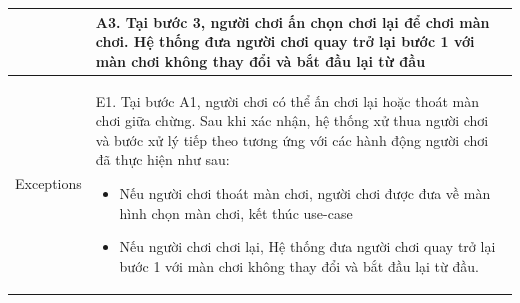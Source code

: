 \begin{center}
\begin{tabular}{|l|p{12cm}|}
		&\qquad A3. Tại bước 3, người chơi ấn chọn chơi lại để chơi màn chơi. Hệ thống đưa người chơi quay trở lại bước 1 với màn chơi không thay đổi và bắt đầu lại từ đầu\\
		\hline
		Exceptions  & \qquad E1. Tại bước A1, người chơi có thể ấn chơi lại hoặc thoát màn chơi giữa chừng. Sau khi xác nhận, hệ thống xử thua người chơi và bước xử lý tiếp theo tương ứng với các hành động người chơi đã thực hiện như sau: \begin{itemize}
			\item Nếu người chơi thoát màn chơi, người chơi được đưa về màn hình chọn màn chơi, kết thúc use-case
			\item Nếu người chơi chơi lại, Hệ thống đưa người chơi quay trở lại bước 1 với màn chơi không thay đổi và bắt đầu lại từ đầu.
		\end{itemize}\\
		\hline
	\end{tabular}
\end{center}

